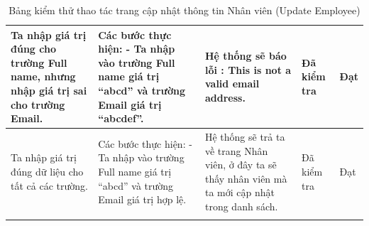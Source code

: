 \documentclass{article}
\begin{document}
\begin{longtable}{ | p{} |p{} | p{}  | p{}  | p{}  | }
\hline
Ta nhập giá trị đúng cho trường Full name, nhưng nhập giá trị sai cho trường Email. &
Các bước thực hiện: \newline
- Ta nhập vào trường Full name giá trị “abcd” và trường Email giá trị “abcdef”.  
&
Hệ thống sẽ báo lỗi : This is not a valid email address.
 &
Đã kiểm tra &
Đạt \\

\hline
Ta nhập giá trị đúng dữ liệu cho tất cả các trường. &
Các bước thực hiện: \newline
- Ta nhập vào trường Full name giá trị “abcd” và trường Email giá trị hợp lệ.  
&
Hệ thống sẽ trả ta về trang Nhân viên, ở đây ta sẽ thấy nhân viên mà ta mới cập nhật trong danh sách.
 &
Đã kiểm tra &
Đạt \\

\hline
\caption{Bảng kiểm thử thao tác trang cập nhật thông tin Nhân viên (Update Employee)}
\end{longtable}

\end{document}
